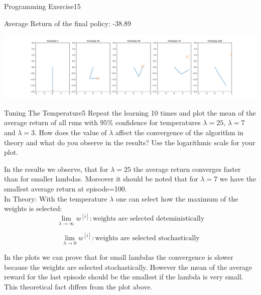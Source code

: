 \begin{questions}
\begin{question}{Programming Exercise}{15}
\begin{answer}
Average Return of the final policy: -38.89
\begin{center}
	\includegraphics[width=1\textwidth]{img/EM-b.pdf}
\end{center}

\end{answer}

\end{question}



\begin{question}{Tuning The Temperature}{5}
Repeat the learning 10 times and plot the mean of the average return of all runs with $95\%$ confidence for temperatures $\lambda = 25$, $\lambda = 7$ and $\lambda = 3$. How does the value of $\lambda$ affect the convergence of the algorithm in theory and what do you observe in the results? 
Use the logarithmic scale for your plot.

\begin{answer}
In the results we observe, that for $\lambda=25$ the average return converges faster than for smaller lambdas. Moreover it should be noted that for $\lambda=7$ we have the smallest average return at episode=100.\\

In Theory: With the temperature $\lambda$ one can select how the maximum of the weights is selected:
\begin{equation}
	\lim_{\lambda \rightarrow \infty} w^{[i]}: \text{weights are selected deteministically}
\end{equation}

\begin{equation}
\lim_{\lambda \rightarrow 0} w^{[i]}: \text{weights are selected stochastically}
\end{equation}

In the plots we can prove that for small lambdas the convergence is slower because the weights are selected stochastically. However the mean of the average reward for the last episode should be the smallest if the lambda is very small. This theoretical fact differs from the plot above.
\end{answer}


\end{question}
\end{questions}
